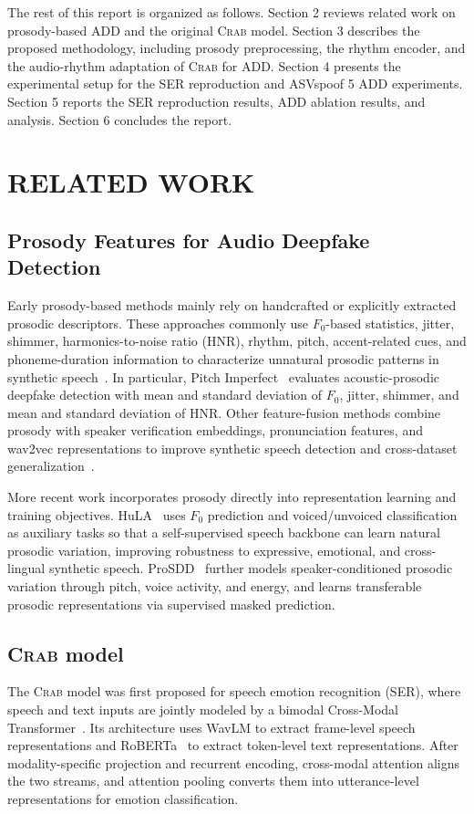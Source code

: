 \documentclass[12pt, a4paper, twocolumn]{article}
\newcommand{\crab}{\textsc{Crab}}
\begin{document}
The rest of this report is organized as follows.
Section 2 reviews related work on prosody-based ADD and the original \crab{} model.
Section 3 describes the proposed methodology, including prosody preprocessing, the rhythm encoder, and the audio-rhythm adaptation of \crab{} for ADD\@.
Section 4 presents the experimental setup for the SER reproduction and ASVspoof 5 ADD experiments.
Section 5 reports the SER reproduction results, ADD ablation results, and analysis.
Section 6 concludes the report.



\section{RELATED WORK}
\subsection{Prosody Features for Audio Deepfake Detection}
Early prosody-based methods mainly rely on handcrafted or explicitly extracted prosodic descriptors.
These approaches commonly use \(F_0\)-based statistics, jitter, shimmer, harmonics-to-noise ratio (HNR), rhythm, pitch, accent-related cues, and phoneme-duration information to characterize unnatural prosodic patterns in synthetic speech~\cite{warren2025pitch,attorresi2022combining,wang2023crossdataset}.
In particular, Pitch Imperfect~\cite{warren2025pitch} evaluates acoustic-prosodic deepfake detection with mean and standard deviation of \(F_0\), jitter, shimmer, and mean and standard deviation of HNR\@.
Other feature-fusion methods combine prosody with speaker verification embeddings, pronunciation features, and wav2vec representations to improve synthetic speech detection and cross-dataset generalization~\cite{attorresi2022combining,wang2023crossdataset}.

More recent work incorporates prosody directly into representation learning and training objectives. HuLA~\cite{mahapatra2025hula} uses \(F_0\) prediction and voiced/unvoiced classification as auxiliary tasks so that a self-supervised speech backbone can learn natural prosodic variation, improving robustness to expressive, emotional, and cross-lingual synthetic speech.
ProSDD~\cite{mahapatra2026prosdd} further models speaker-conditioned prosodic variation through pitch, voice activity, and energy, and learns transferable prosodic representations via supervised masked prediction.

\subsection{\crab{} model}
The \crab{} model was first proposed for speech emotion recognition (SER), where speech and text inputs are jointly modeled by a bimodal Cross-Modal Transformer~\cite{ueda2026crab}.
Its architecture uses WavLM to extract frame-level speech representations and RoBERTa~\cite{liu2019roberta} to extract token-level text representations.
After modality-specific projection and recurrent encoding, cross-modal attention aligns the two streams, and attention pooling converts them into utterance-level representations for emotion classification.
\end{document}

